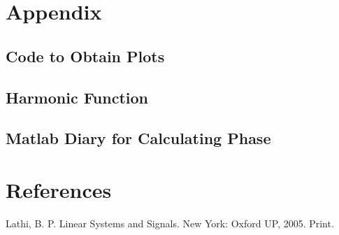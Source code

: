 \documentclass{article}
\begin{document}
\section{Appendix}

\subsection{Code to Obtain Plots}

\subsection{Harmonic Function}

\subsection{Matlab Diary for Calculating Phase}


\section{References}

Lathi, B. P. Linear Systems and Signals. New York: Oxford UP, 2005. Print.
\end{document}
